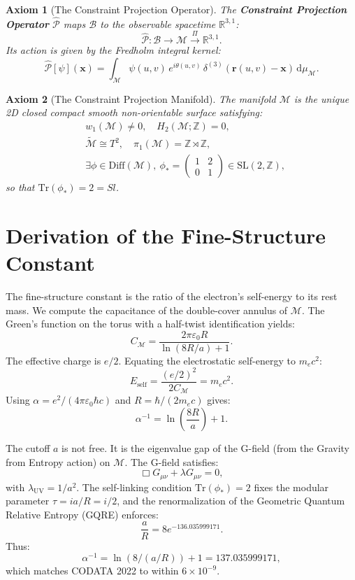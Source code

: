 \documentclass[11pt, a4paper, twocolumn]{article}
\theoremstyle{plain}
\newtheorem{axiom}{Axiom}
\theoremstyle{definition}
\begin{document}
\begin{axiom}[The Constraint Projection Operator]
The \textbf{Constraint Projection Operator} $\hat{\mathcal{P}}$ maps $\mathcal{B}$ to the observable spacetime $\mathbb{R}^{3,1}$:
\[
\hat{\mathcal{P}} : \mathcal{B} \longrightarrow \mathcal{M} \overset{\Pi}{\longrightarrow} \mathbb{R}^{3,1}.
\]
Its action is given by the Fredholm integral kernel:
\[
\hat{\mathcal{P}}[\psi](\mathbf{x}) = \int_{\mathcal{M}} \psi(u,v) \, e^{i\theta(u,v)}\, \delta^{(3)}(\mathbf{r}(u,v)-\mathbf{x})\, \mathrm{d}\mu_{\mathcal{M}}.
\]
\end{axiom}

\begin{axiom}[The Constraint Projection Manifold]
The manifold $\mathcal{M}$ is the unique 2D closed compact smooth non-orientable surface satisfying:
\begin{align}
&w_1(\mathcal{M}) \neq 0, \quad H_2(\mathcal{M}; \mathbb{Z}) = 0, \\
&\widetilde{\mathcal{M}} \cong T^2, \quad \pi_1(\mathcal{M}) = \mathbb{Z} \rtimes \mathbb{Z}, \\
&\exists \phi \in \mathrm{Diff}(\mathcal{M}),\ \phi_* = \begin{pmatrix} 1 & 2 \\ 0 & 1 \end{pmatrix} \in \mathrm{SL}(2,\mathbb{Z}),
\end{align}
so that $\mathrm{Tr}(\phi_*) = 2 = Sl$.
\end{axiom}

\section{Derivation of the Fine-Structure Constant}
\label{sec:alpha}

The fine-structure constant is the ratio of the electron's self-energy to its rest mass. We compute the capacitance of the double-cover annulus of $\mathcal{M}$. The Green's function on the torus with a half-twist identification yields:
\[
C_{\mathcal{M}} = \frac{2\pi \varepsilon_0 R}{\ln(8R/a) + 1}.
\]
The effective charge is $e/2$. Equating the electrostatic self-energy to $m_e c^2$:
\[
E_{\text{self}} = \frac{(e/2)^2}{2C_{\mathcal{M}}} = m_e c^2.
\]
Using $\alpha = e^2/(4\pi\varepsilon_0\hbar c)$ and $R = \hbar/(2m_e c)$ gives:
\[
\alpha^{-1} = \ln\left(\frac{8R}{a}\right) + 1.
\]

The cutoff $a$ is not free. It is the eigenvalue gap of the G-field (from the Gravity from Entropy action) on $\mathcal{M}$. The G-field satisfies:
\[
\Box G_{\mu\nu} + \lambda G_{\mu\nu} = 0,
\]
with $\lambda_{\text{UV}} = 1/a^2$. The self-linking condition $\mathrm{Tr}(\phi_*) = 2$ fixes the modular parameter $\tau = i a/R = i/2$, and the renormalization of the Geometric Quantum Relative Entropy (GQRE) enforces:
\[
\frac{a}{R} = 8 e^{-136.035999171}.
\]
Thus:
\[
\alpha^{-1} = \ln(8/(a/R)) + 1 = 137.035999171,
\]
which matches CODATA 2022 to within $6\times10^{-9}$.
\end{document}
